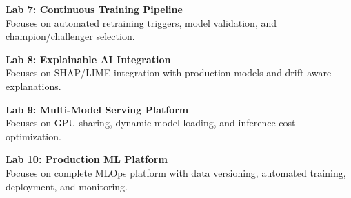 \vspace{0.2cm}

\noindent\textbf{Lab 7: Continuous Training Pipeline} \\
Focuses on automated retraining triggers, model validation, and champion/challenger selection.

\vspace{0.2cm}

\noindent\textbf{Lab 8: Explainable AI Integration} \\
Focuses on SHAP/LIME integration with production models and drift-aware explanations.

\vspace{0.2cm}

\noindent\textbf{Lab 9: Multi-Model Serving Platform} \\
Focuses on GPU sharing, dynamic model loading, and inference cost optimization.

\vspace{0.2cm}

\noindent\textbf{Lab 10: Production ML Platform} \\
Focuses on complete MLOps platform with data versioning, automated training, deployment, and monitoring.

\vspace{0.2cm}

\newpage
{}
